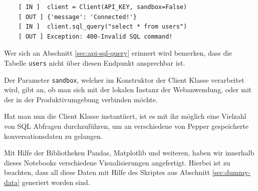 \begin{lstlisting}
    [ IN ]  client = Client(API_KEY, sandbox=False)
    [ OUT ] {'message': 'Connected!'}
    [ IN ]  client.sql_query("select * from users")
    [ OUT ] Exception: 400-Invalid SQL command!
\end{lstlisting}

Wer sich an Abschnitt \ref{sec:api-sql-query} erinnert wird bemerken, dass die Tabelle \verb|users| nicht über diesen
Endpunkt ansprechbar ist.

Der Parameter \verb|sandbox|, welcher im Konstruktor der Client Klasse verarbeitet wird, gibt an, ob man sich mit
der lokalen Instanz der Webanwendung, oder mit der in der Produktivumgebung verbinden möchte.

Hat man nun die Client Klasse instantiiert, ist es mit ihr möglich eine Vielzahl von SQL Abfragen durchzuführen, um
an verschiedene von Pepper gespeicherte konversationsdaten zu gelangen.

Mit Hilfe der Bibliotheken Pandas, Matplotlib und weiteren, haben wir innerhalb dieses Notebooks verschiedene Visualisierungen
angefertigt. Hierbei ist zu beachten, dass all diese Daten mit Hilfe des Skriptes aus Abschnitt \ref{sec:dummy-data}
generiert worden sind.

